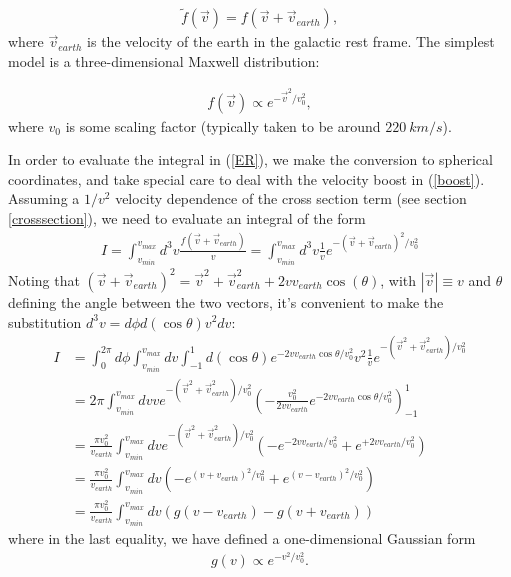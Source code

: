 \documentclass[11pt]{article}
\begin{document}
\begin{equation}\label{boost}
\begin{split}
	\tilde{f}(\vec{v}) = f(\vec{v} + \vec{v}_{earth}),
\end{split}
\end{equation}
where $\vec{v}_{earth}$ is the velocity of the earth in the galactic rest 
frame. The simplest model is a three-dimensional Maxwell distribution:

\begin{equation}
\begin{split}
	f(\vec{v}) \propto e^{-\vec{v}^2/v_0^2},
\end{split}
\end{equation}
where $v_0$ is some scaling factor (typically taken to be around $220\ km/s$).

In order to evaluate the integral in (\ref{ER}), we make the conversion to 
spherical coordinates, and take special care to deal with the velocity boost 
in (\ref{boost}). Assuming a $1/v^2$ velocity dependence of the cross section 
term (see section \ref{crosssection}), we need to evaluate an integral of the 
form
\begin{equation}
\begin{split}
	I = \int_{v_{min}}^{v_{max}} d^3v \frac{f(\vec{v} + \vec{v}_{earth})}{v} =
    	\int_{v_{min}}^{v_{max}} d^3v \frac{1}{v} e^{-(\vec{v}+\vec{v}_{earth})^2/v_0^2}
\end{split}
\end{equation}
Noting that $(\vec{v}+\vec{v}_{earth})^2 = \vec{v}^2 + \vec{v}^2_{earth} + 
2vv_{earth}\cos(\theta)$, with $|\vec{v}|\equiv v$ and $\theta$ defining 
the angle between the two vectors, it's convenient to make the substitution 
$d^3v = d\phi d(\cos \theta) v^2 dv$:
\begin{equation}
\begin{split}
	I &=  \int_0^{2\pi} d\phi \int_{v_{min}}^{v_{max}} dv \int_{-1}^1 d(\cos \theta) e^{-2vv_{earth}\cos\theta/v_0^2} v^2 \frac{1}{v} e^{-(\vec{v}^2+\vec{v}^2_{earth})/v_0^2}\\
	&= 2\pi \int_{v_{min}}^{v_{max}} dv v e^{-(\vec{v}^2+\vec{v}^2_{earth})/v_0^2} \left(-\frac{v_0^2}{2vv_{earth}} e^{-2vv_{earth}\cos\theta/v_0^2}\right)_{-1}^1\\
	&= \frac{\pi v_0^2}{v_{earth} }\int_{v_{min}}^{v_{max}} dv e^{-(\vec{v}^2+\vec{v}^2_{earth})/v_0^2} 
		\left(- e^{-2vv_{earth}/v_0^2} + e^{+2vv_{earth}/v_0^2}\right)\\
	&= \frac{\pi v_0^2}{v_{earth} }\int_{v_{min}}^{v_{max}} dv 
		\left(- e^{(v+v_{earth})^2/v_0^2} + e^{(v-v_{earth})^2/v_0^2}\right)\\
	&= \frac{\pi v_0^2}{v_{earth} }\int_{v_{min}}^{v_{max}} dv 
		\left( g(v-v_{earth}) - g(v+v_{earth}) \right)
\end{split}
\end{equation}
where in the last equality, we have defined a one-dimensional Gaussian form
\begin{equation}
\begin{split}
	g(v) \propto e^{-v^2/v_0^2}.
\end{split}
\end{equation}
\end{document}
